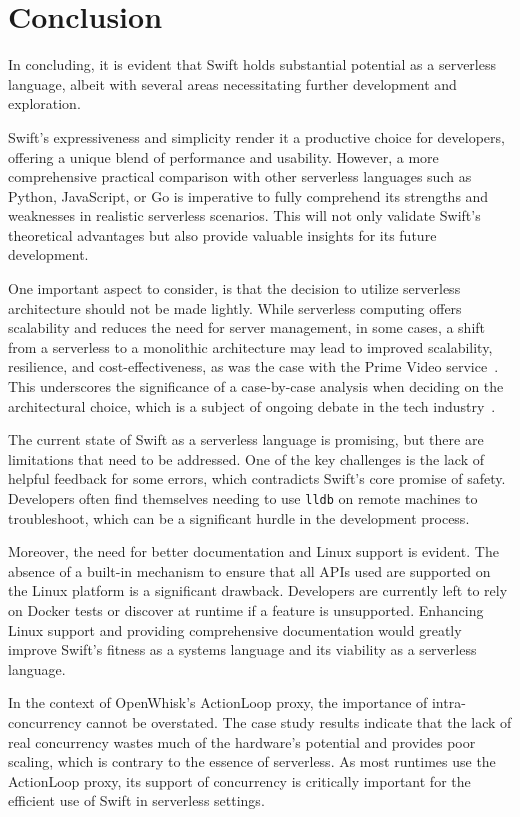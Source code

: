 \chapter{Conclusion}
\label{chap:conclusion}
In concluding, it is evident that Swift holds substantial potential as a serverless language, albeit with several areas necessitating further development and exploration.

Swift's expressiveness and simplicity render it a productive choice for developers, offering a unique blend of performance and usability. However, a more comprehensive practical comparison with other serverless languages such as Python, JavaScript, or Go is imperative to fully comprehend its strengths and weaknesses in realistic serverless scenarios. This will not only validate Swift's theoretical advantages but also provide valuable insights for its future development.

One important aspect to consider, is that the decision to utilize serverless architecture should not be made lightly. While serverless computing offers scalability and reduces the need for server management, in some cases, a shift from a serverless to a monolithic architecture may lead to improved scalability, resilience, and cost-effectiveness, as was the case with the Prime Video service~\cite{primevideo2023}. This underscores the significance of a case-by-case analysis when deciding on the architectural choice, which is a subject of ongoing debate in the tech industry~\cite{virtualizationreview2023}.

The current state of Swift as a serverless language is promising, but there are limitations that need to be addressed. One of the key challenges is the lack of helpful feedback for some errors, which contradicts Swift's core promise of safety. Developers often find themselves needing to use \texttt{lldb} on remote machines to troubleshoot, which can be a significant hurdle in the development process.

Moreover, the need for better documentation and Linux support is evident. The absence of a built-in mechanism to ensure that all APIs used are supported on the Linux platform is a significant drawback. Developers are currently left to rely on Docker tests or discover at runtime if a feature is unsupported. Enhancing Linux support and providing comprehensive documentation would greatly improve Swift's fitness as a systems language and its viability as a serverless language.

In the context of OpenWhisk's ActionLoop proxy, the importance of intra-concurrency cannot be overstated. The case study results indicate that the lack of real concurrency wastes much of the hardware's potential and provides poor scaling, which is contrary to the essence of serverless. As most runtimes use the ActionLoop proxy, its support of concurrency is critically important for the efficient use of Swift in serverless settings.

